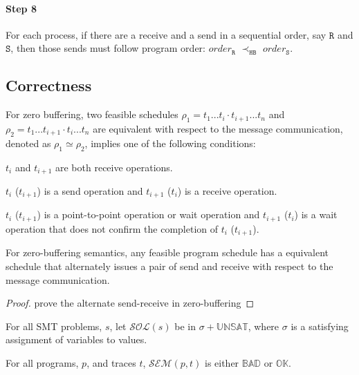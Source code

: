 \paragraph*{Step 8} For each process, if there are a receive and a send in a sequential order, say $\mathtt{R}$ and $\mathtt{S}$, then those
sends must follow program order: $\mathit{order}_\mathtt{R}$
$\prec_\mathtt{HB}$ $\mathit{order}_\mathtt{S}$. 

\subsection{Correctness}

\begin{definition}
For zero buffering, two feasible schedules $\rho_1 = t_1...t_i\cdot t_{i+1}...t_n$ and $\rho_2 = t_1...t_{i+1}\cdot t_i...t_n$ are equivalent with respect to the message communication, denoted as $\rho_1 \simeq \rho_2$, implies one of the following conditions:
\begin{compactenum} 
\item $t_i$ and $t_{i+1}$ are both receive operations.
\item $t_i$ ($t_{i+1}$) is a send operation and $t_{i+1}$ ($t_i$) is a receive operation.
\item $t_i$ ($t_{i+1}$) is a point-to-point operation or wait operation and $t_{i+1}$ ($t_i$) is a wait operation that does not confirm the completion of $t_i$ ($t_{i+1}$).
\end{compactenum}
\end{definition}

\begin{lemma}
For zero-buffering semantics, any feasible program schedule has a equivalent schedule that alternately issues a pair of send and receive with respect to the message communication. 
\end{lemma}

\begin{proof}
prove the alternate send-receive in zero-buffering
\end{proof}

\begin{definition}
For all SMT problems, $s$, let $\mathcal{SOL}(s)$ be in $\sigma +
\mathbb{UNSAT}$, where $\sigma$ is a satisfying assignment of
variables to values.
\end{definition}

\begin{definition}[Semantics]
For all programs, $p$, and traces $t$, $\mathcal{SEM}(p, t)$ is either
$\mathbb{BAD}$ or $\mathbb{OK}$.
\end{definition}

